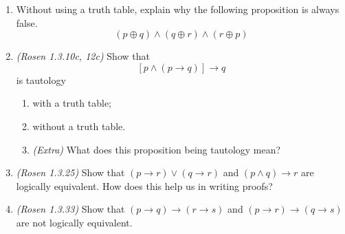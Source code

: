 \documentclass{article}
\begin{document}
\begin{enumerate}
\item Without using a truth table, explain why the following proposition is always false.
\[
	(p \oplus q) \wedge (q \oplus r) \wedge (r \oplus p)
\]

\item {\em (Rosen 1.3.10c, 12c)} Show that
\[
	[p \wedge (p \to q)] \to q
\]
is tautology
\begin{enumerate}
\item with a truth table;
\item without a truth table.
\item {\em (Extra)} What does this proposition being tautology mean?
\end{enumerate}

\item {\em (Rosen 1.3.25)} Show that $(p \to r) \vee (q \to r)$ and $(p \wedge q) \to r$ are logically equivalent. How does this help us in writing proofs?

\item {\em (Rosen 1.3.33)} Show that $(p \to q) \to (r \to s)$ and $(p \to r) \to (q \to s)$ are not logically equivalent.
\end{enumerate}
\end{document}
